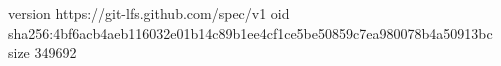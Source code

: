 version https://git-lfs.github.com/spec/v1
oid sha256:4bf6acb4aeb116032e01b14c89b1ee4cf1ce5be50859c7ea980078b4a50913bc
size 349692

